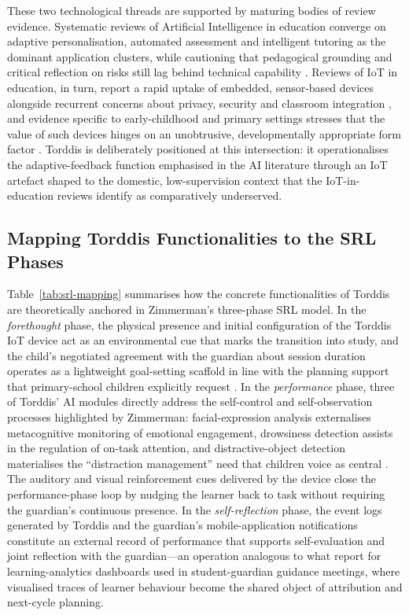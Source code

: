 These two technological threads are supported by maturing bodies of review evidence. Systematic reviews of Artificial Intelligence in education converge on adaptive personalisation, automated assessment and intelligent tutoring as the dominant application clusters, while cautioning that pedagogical grounding and critical reflection on risks still lag behind technical capability \citep{ZawackiRichter2019Systematic, Wang2025Development}. Reviews of IoT in education, in turn, report a rapid uptake of embedded, sensor-based devices alongside recurrent concerns about privacy, security and classroom integration \citep{Kassab2020Systematic}, and evidence specific to early-childhood and primary settings stresses that the value of such devices hinges on an unobtrusive, developmentally appropriate form factor \citep{Ling2022Use}. Torddis is deliberately positioned at this intersection: it operationalises the adaptive-feedback function emphasised in the AI literature through an IoT artefact shaped to the domestic, low-supervision context that the IoT-in-education reviews identify as comparatively underserved.

\subsection{Mapping Torddis Functionalities to the SRL Phases}
\label{sec:srl-mapping-section}
Table~\ref{tab:srl-mapping} summarises how the concrete functionalities of Torddis are theoretically anchored in Zimmerman's three-phase SRL model. In the \textit{forethought} phase, the physical presence and initial configuration of the Torddis IoT device act as an environmental cue that marks the transition into study, and the child's negotiated agreement with the guardian about session duration operates as a lightweight goal-setting scaffold in line with the planning support that primary-school children explicitly request \citep{Amaefule2025Childrens}. In the \textit{performance} phase, three of Torddis' AI modules directly address the self-control and self-observation processes highlighted by Zimmerman: facial-expression analysis externalises metacognitive monitoring of emotional engagement, drowsiness detection assists in the regulation of on-task attention, and distractive-object detection materialises the ``distraction management'' need that children voice as central \citep{Amaefule2025Childrens}. The auditory and visual reinforcement cues delivered by the device close the performance-phase loop by nudging the learner back to task without requiring the guardian's continuous presence. In the \textit{self-reflection} phase, the event logs generated by Torddis and the guardian's mobile-application notifications constitute an external record of performance that supports self-evaluation and joint reflection with the guardian---an operation analogous to what \citet{Kleimola2025Promoting} report for learning-analytics dashboards used in student-guardian guidance meetings, where visualised traces of learner behaviour become the shared object of attribution and next-cycle planning.


